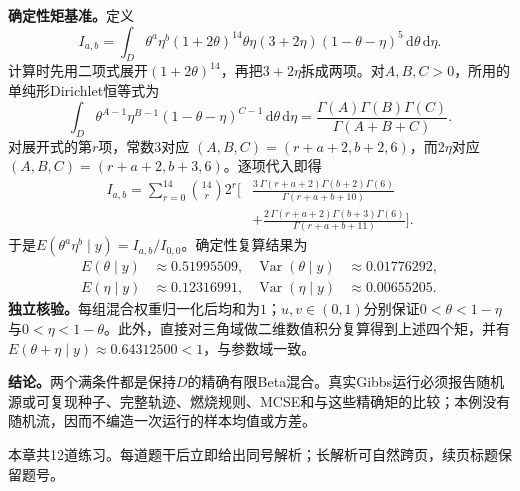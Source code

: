 \begin{solution}
\textbf{确定性矩基准。}定义
\[
I_{a,b}=\int_D \theta^a\eta^b
(1+2\theta)^{14}\theta\eta(3+2\eta)
(1-\theta-\eta)^5\,\mathrm d\theta\,\mathrm d\eta.
\]
计算时先用二项式展开$(1+2\theta)^{14}$，再把$3+2\eta$拆成两项。对$A,B,C>0$，所用的单纯形Dirichlet恒等式为
\[
\int_D\theta^{A-1}\eta^{B-1}(1-\theta-\eta)^{C-1}
\,\mathrm d\theta\,\mathrm d\eta
=\frac{\Gamma(A)\Gamma(B)\Gamma(C)}{\Gamma(A+B+C)}.
\]
对展开式的第$r$项，常数$3$对应
$(A,B,C)=(r+a+2,b+2,6)$，而$2\eta$对应
$(A,B,C)=(r+a+2,b+3,6)$。逐项代入即得
\begin{align}
I_{a,b}
=\sum_{r=0}^{14}\binom{14}{r}2^r\Bigg[
&\frac{3\,\Gamma(r+a+2)\Gamma(b+2)\Gamma(6)}
{\Gamma(r+a+b+10)}\\
&+\frac{2\,\Gamma(r+a+2)\Gamma(b+3)\Gamma(6)}
{\Gamma(r+a+b+11)}\Bigg].
\end{align}
于是$E(\theta^a\eta^b\mid y)=I_{a,b}/I_{0,0}$。确定性复算结果为
\begin{align*}
E(\theta\mid y)&\approx0.51995509,
&\operatorname{Var}(\theta\mid y)&\approx0.01776292,\\
E(\eta\mid y)&\approx0.12316991,
&\operatorname{Var}(\eta\mid y)&\approx0.00655205.
\end{align*}
\textbf{独立核验。}每组混合权重归一化后均和为$1$；$u,v\in(0,1)$分别保证$0<\theta<1-\eta$与$0<\eta<1-\theta$。此外，直接对三角域做二维数值积分复算得到上述四个矩，并有
$E(\theta+\eta\mid y)\approx0.64312500<1$，与参数域一致。

\textbf{结论。}两个满条件都是保持$D$的精确有限Beta混合。真实Gibbs运行必须报告随机源或可复现种子、完整轨迹、燃烧规则、MCSE和与这些精确矩的比较；本例没有随机流，因而不编造一次运行的样本均值或方差。
\end{solution}

\label{struct:V5-C04-CH34}
\begin{chapterexercisebox}
\label{struct:V5-C04-CH35}
本章共12道练习。每道题干后立即给出同号解析；长解析可自然跨页，续页标题保留题号。
\end{chapterexercisebox}

